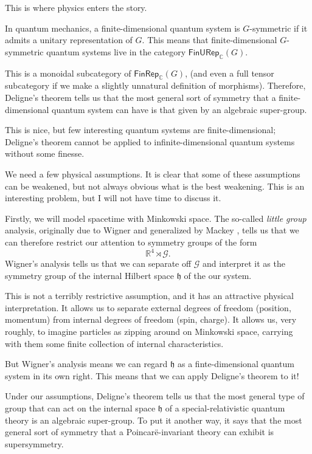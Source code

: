 \documentclass[a4paper]{report}
\newcommand{\R}{\mathbb{R}}
\newcommand{\C}{\mathbb{C}}
\theoremstyle{definition}
\theoremstyle{plain}
\theoremstyle{remark}
\begin{document}
This is where physics enters the story.

In quantum mechanics, a finite-dimensional quantum system is $G$-symmetric if it admits a unitary representation of $G$. This means that finite-dimensional $G$-symmetric quantum systems live in the category $\mathsf{FinURep}_{\C}(G)$.

This is a monoidal subcategory of $\mathsf{FinRep}_{\C}(G)$, (and even a full tensor subcategory if we make a slightly unnatural definition of morphisms). Therefore, Deligne's theorem tells us that the most general sort of symmetry that a finite-dimensional quantum system can have is that given by an algebraic super-group.

This is nice, but few interesting quantum systems are finite-dimensional; Deligne's theorem cannot be applied to infinite-dimensional quantum systems without some finesse.

We need a few physical assumptions. It is clear that some of these assumptions can be weakened, but not always obvious what is the best weakening. This is an interesting problem, but I will not have time to discuss it.

Firstly, we will model spacetime with Minkowski space. The so-called \emph{little group} analysis, originally due to Wigner \cite{wigner-little-group} and generalized by Mackey \cite{mackey-induced-representations}, tells us that we can therefore restrict our attention to symmetry groups of the form 
\begin{equation*}
  \R^{4} \rtimes \mathcal{G}.
\end{equation*}
Wigner's analysis tells us that we can separate off $\mathcal{G}$ and interpret it as the symmetry group of the internal Hilbert space $\mathfrak{h}$ of the our system.

This is not a terribly restrictive assumption, and it has an attractive physical interpretation. It allows us to separate external degrees of freedom (position, momentum) from internal degrees of freedom (spin, charge). It allows us, very roughly, to imagine particles as zipping around on Minkowski space, carrying with them some finite collection of internal characteristics.

But Wigner's analysis means we can regard $\mathfrak{h}$ as a finte-dimensional quantum system in its own right. This means that we can apply Deligne's theorem to it! 

Under our assumptions, Deligne's theorem tells us that the most general type of group that can act on the internal space $\mathfrak{h}$ of a special-relativistic quantum theory is an algebraic super-group. To put it another way, it says that the most general sort of symmetry that a Poincar\"{e}-invariant theory can exhibit is supersymmetry.
\end{document}
